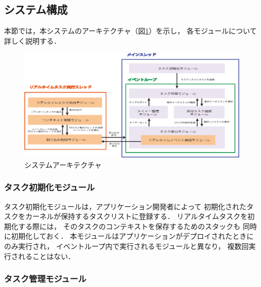 \subsection{システム構成}
本節では，本システムのアーキテクチャ（図\ref{fig:system_architecture}）を示し，
各モジュールについて詳しく説明する．


\begin{figure}[htbp]
 \begin{center}
  \includegraphics[width=150mm]{./images/system_architecture.eps}
 \end{center}
 \caption{システムアーキテクチャ}
 \label{fig:system_architecture}
\end{figure}


\subsubsection{タスク初期化モジュール}

\vspace{0.5em}タスク初期化モジュールは，アプリケーション開発者によって
初期化されたタスクをカーネルが保持するタスクリストに登録する．
リアルタイムタスクを初期化する際には，
そのタスクのコンテキストを保存するためのスタックも
同時に初期化しておく．
本モジュールはアプリケーションがデプロイされたときにのみ実行され，
イベントループ内で実行されるモジュールと異なり，
複数回実行されることはない．



\subsubsection{タスク管理モジュール}

